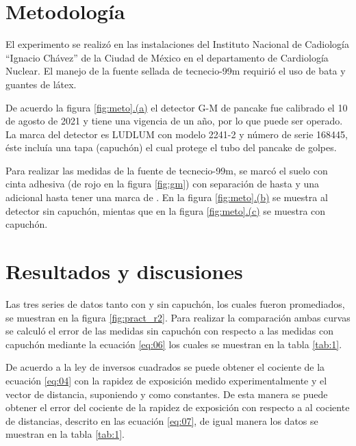 \begin{multicols}{2}
  \section*{Metodología}

El experimento se realizó en las instalaciones del Instituto Nacional de Cadiología ``Ignacio Chávez'' de la Ciudad de México en el departamento de Cardiología Nuclear. El manejo de la fuente sellada de tecnecio-99m requirió el uso de bata y guantes de látex.

De acuerdo la figura \hyperref[fig:meto]{\ref{fig:meto}.(a)} el detector G-M de pancake  fue calibrado el 10 de agosto de 2021 y tiene una vigencia de un año, por lo que puede ser operado. La marca del detector es LUDLUM con modelo 2241-2 y número de serie 168445, éste incluía una tapa (capuchón) el cual protege el tubo del pancake de golpes. 

Para realizar las medidas de la fuente de tecnecio-99m, se marcó el suelo con cinta adhesiva (de rojo en la figura \ref{fig:gm}) con separación de  hasta  y una adicional hasta tener una marca de .  En la figura \hyperref[fig:meto]{\ref{fig:meto}.(b)} se muestra al detector sin capuchón, mientas que en la figura \hyperref[fig:meto]{\ref{fig:meto}.(c)} se muestra con capuchón.





  \section{Resultados  y discusiones}

Las tres series de datos tanto con y sin capuchón, los cuales fueron promediados, se muestran en la figura \ref{fig:pract_r2}. Para realizar la comparación ambas curvas se calculó el error de las medidas sin capuchón con respecto a las medidas con capuchón mediante la ecuación \ref{eq:06} los cuales se muestran en la tabla \ref{tab:1}.

De acuerdo a la ley de inversos cuadrados se puede obtener el cociente de la ecuación \ref{eq:04} con la rapidez de exposición medido experimentalmente y el vector de distancia, suponiendo  y \ec{\Gamma} como constantes. De esta manera se puede obtener el error del cociente de la rapidez de exposición con respecto a al cociente de distancias, descrito en las ecuación \ref{eq:07}, de igual manera los datos se muestran en la tabla \ref{tab:1}.






\end{multicols}

